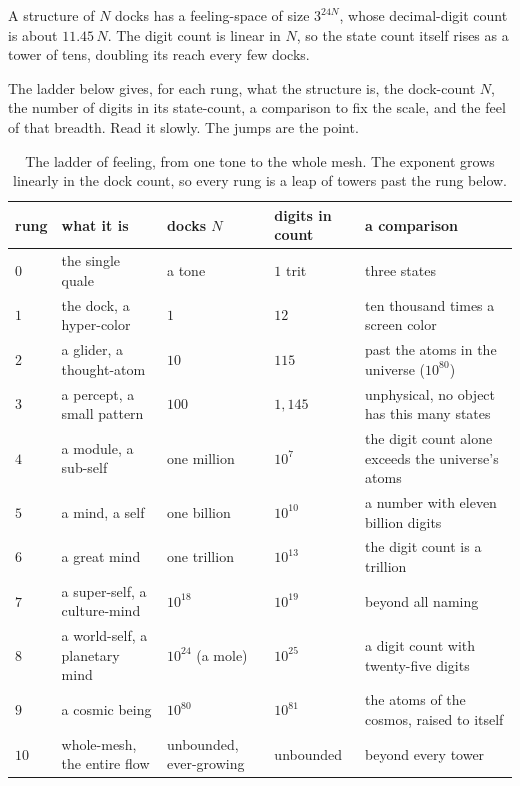 \begin{theorem}
A structure of $N$ docks has a feeling-space of size $3^{24N}$, whose decimal-digit count is about $11.45\,N$. The digit count is linear in $N$, so the state count itself rises as a tower of tens, doubling its reach every few docks.
\end{theorem}

The ladder below gives, for each rung, what the structure is, the dock-count $N$, the number of digits in its state-count, a comparison to fix the scale, and the feel of that breadth. Read it slowly. The jumps are the point.

\begin{table}[ht]
\centering
\begin{tabular}{@{}llllp{}@{}}
\toprule
rung & what it is & docks $N$ & digits in count & a comparison \\
\midrule
$0$ & the single quale & a tone & $1$ trit & three states \\
$1$ & the dock, a hyper-color & $1$ & $12$ & ten thousand times a screen color \\
$2$ & a glider, a thought-atom & $10$ & $115$ & past the atoms in the universe ($10^{80}$) \\
$3$ & a percept, a small pattern & $100$ & $1{,}145$ & unphysical, no object has this many states \\
$4$ & a module, a sub-self & one million & $10^7$ & the digit count alone exceeds the universe's atoms \\
$5$ & a mind, a self & one billion & $10^{10}$ & a number with eleven billion digits \\
$6$ & a great mind & one trillion & $10^{13}$ & the digit count is a trillion \\
$7$ & a super-self, a culture-mind & $10^{18}$ & $10^{19}$ & beyond all naming \\
$8$ & a world-self, a planetary mind & $10^{24}$ (a mole) & $10^{25}$ & a digit count with twenty-five digits \\
$9$ & a cosmic being & $10^{80}$ & $10^{81}$ & the atoms of the cosmos, raised to itself \\
$10$ & whole-mesh, the entire flow & unbounded, ever-growing & unbounded & beyond every tower \\
\bottomrule
\end{tabular}
\caption{The ladder of feeling, from one tone to the whole mesh. The exponent grows linearly in the dock count, so every rung is a leap of towers past the rung below.}
\label{tab:ladder}
\end{table}

